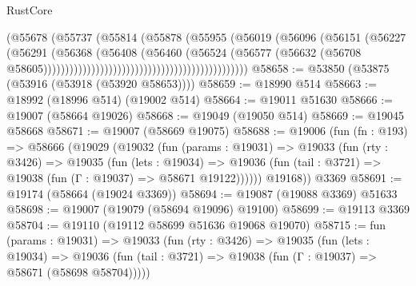 \begin{lexlean}{RustCore}
\begin{coremodule}
                                                                (@55678
                                                                  (@55737
                                                                    (@55814
                                                                      (@55878
                                                                        (@55955
                                                                          (@56019
                                                                            (@56096
                                                                              (@56151
                                                                                (@56227
                                                                                  (@56291
                                                                                    (@56368
                                                                                      (@56408
                                                                                        (@56460
                                                                                          (@56524
                                                                                            (@56577
                                                                                              (@56632
                                                                                                (@56708
                                                                                                  @58605)))))))))))))))))))))))))))))))))))))))))))))))
@58658 := @53850 (@53875 (@53916 (@53918 (@53920 @58653))))
@58659 := @18990 @514
@58663 := @18992 (@18996 @514) (@19002 @514)
@58664 := @19011 @51630
@58666 := @19007 (@58664 @19026)
@58668 := @19049 (@19050 @514)
@58669 := @19045 @58668
@58671 := @19007 (@58669 @19075)
@58688 := @19006
    (fun (fn : @193) =>
    @58666
      (@19029
        (@19032
          (fun (params : @19031) =>
          @19033
            (fun (rty : @3426) =>
            @19035
              (fun (lets : @19034) =>
              @19036 (fun (tail : @3721) => @19038 (fun (Γ : @19037) => @58671 @19122))))))
        @19168))
    @3369
@58691 := @19174 (@58664 (@19024 @3369))
@58694 := @19087 (@19088 @3369) @51633
@58698 := @19007 (@19079 (@58694 @19096) @19100)
@58699 := @19113 @3369
@58704 := @19110 (@19112 @58699 @51636 @19068 @19070)
@58715 := fun (params : @19031) =>
  @19033
    (fun (rty : @3426) =>
    @19035
      (fun (lets : @19034) =>
      @19036 (fun (tail : @3721) => @19038 (fun (Γ : @19037) => @58671 (@58698 @58704)))))

\end{coremodule}
\end{lexlean}
